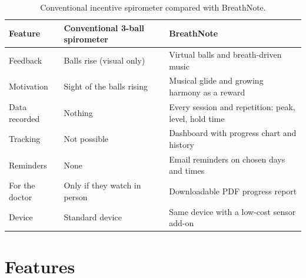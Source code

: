 \documentclass[12pt,a4paper]{article}
\renewcommand{\arraystretch}{1.2}
\begin{document}
\begin{table}[H]
\centering
\caption{Conventional incentive spirometer compared with BreathNote.}
\label{tab:compare}
\footnotesize
\renewcommand{\arraystretch}{1.05}
\begin{tabularx}{\linewidth}{@{}P{2.4cm} P{4.6cm} L@{}}
\toprule
\textbf{Feature} & \textbf{Conventional 3-ball spirometer} & \textbf{BreathNote} \\
\midrule
Feedback       & Balls rise (visual only)     & Virtual balls and breath-driven music \\
Motivation     & Sight of the balls rising    & Musical glide and growing harmony as a reward \\
Data recorded  & Nothing                      & Every session and repetition: peak, level, hold time \\
Tracking       & Not possible                 & Dashboard with progress chart and history \\
Reminders      & None                         & Email reminders on chosen days and times \\
For the doctor & Only if they watch in person & Downloadable PDF progress report \\
Device         & Standard device              & Same device with a low-cost sensor add-on \\
\bottomrule
\end{tabularx}
\end{table}

\section{Features}
\label{sec:features}
\end{document}
